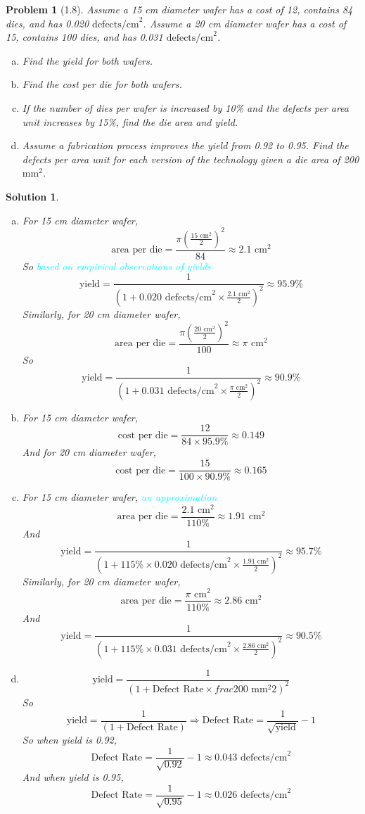 \documentclass[12pt]{article}
\newtheorem{problem}{Problem}[]
\newtheorem*{solution}{Solution}
\begin{document}
  \begin{problem}[1.8]
    Assume a 15 cm diameter wafer has a cost of 12, contains 84 dies, and has 0.020 $\text{defects/cm}^2$. Assume a 20 cm diameter wafer has a cost of 15, contains 100 dies, and has 0.031 $\text{defects/cm}^2$.
    \begin{enumerate}[a.]
      \item Find the yield for both wafers.
      \item Find the cost per die for both wafers.
      \item If the number of dies per wafer is increased by 10\% and the defects per area unit increases by 15\%, find the die area and yield.
      \item Assume a fabrication process improves the yield from 0.92 to 0.95. Find the defects per area unit for each version of the technology given a die area of 200 $\text{mm}^2$.
    \end{enumerate}
  \end{problem}

  \begin{solution}
    \begin{enumerate}[a.]
      \item For 15 cm diameter wafer,
      \[\text{area per die} = \frac{\pi (\frac{15\text{ cm}^2}{2})^2}{84}\approx 2.1\text{ cm}^2\]
      So \textcolor{cyan}{based on empirical observations of yields}
      \[\text{yield} = \frac{1}{(1+0.020\text{ defects/cm}^2 \times \frac{2.1\text{ cm}^2}{2})^2}\approx 95.9\%\]
      Similarly, for 20 cm diameter wafer,
      \[\text{area per die} = \frac{\pi (\frac{20\text{ cm}^2}{2})^2}{100}\approx \pi \text{ cm}^2\]
      So
      \[\text{yield} = \frac{1}{(1+0.031\text{ defects/cm}^2 \times \frac{\pi\text{ cm}^2}{2})^2}\approx 90.9\%\]
      \item For 15 cm diameter wafer,
      \[\text{cost per die} = \frac{12}{84\times 95.9\%}\approx 0.149\]
      And for 20 cm diameter wafer,
      \[\text{cost per die} = \frac{15}{100\times 90.9\%}\approx 0.165\]
      \item For 15 cm diameter wafer,  \textcolor{cyan}{an approximation}
      \[\text{area per die} = \frac{2.1\text{ cm}^2}{110\%}\approx 1.91\text{ cm}^2\]
      And
      \[\text{yield} = \frac{1}{(1+115\%\times 0.020\text{ defects/cm}^2 \times \frac{1.91\text{ cm}^2}{2})^2}\approx 95.7\%\]
      Similarly, for 20 cm diameter wafer,
      \[\text{area per die} = \frac{\pi\text{ cm}^2}{110\%}\approx 2.86\text{ cm}^2\]
      And 
      \[\text{yield} = \frac{1}{(1+115\%\times 0.031\text{ defects/cm}^2 \times \frac{2.86\text{ cm}^2}{2})^2}\approx 90.5\%\]
      \item \[\text{yield} = \frac{1}{(1+\text{Defect Rate}\times frac{200\text{ mm}^2}{2})^2}\]
      So 
      \[\text{yield} = \frac{1}{(1+\text{Defect Rate})}\Longrightarrow\text{Defect Rate}= \frac{1}{\sqrt{\text{yield}}}-1\]
      So when yield is 0.92,
      \[\text{Defect Rate}= \frac{1}{\sqrt{\text{0.92}}}-1\approx 0.043\text{ defects/cm}^2\]
      And when yield is 0.95,
      \[\text{Defect Rate}= \frac{1}{\sqrt{\text{0.95}}}-1\approx 0.026\text{ defects/cm}^2\]
    \end{enumerate}
  \end{solution}
\end{document}
